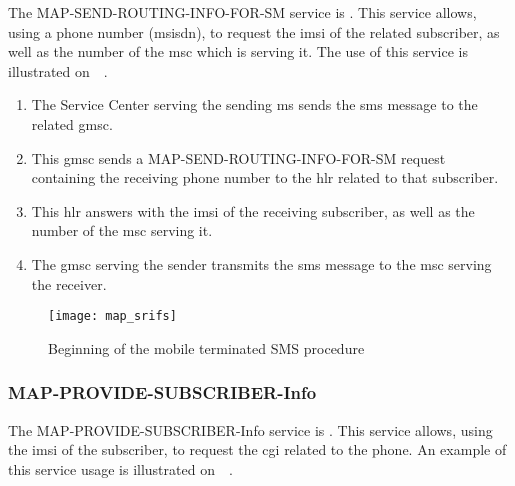         The MAP-SEND-ROUTING-INFO-FOR-SM service is . This service allows, using a phone number (\gls{msisdn}), to
    request the \gls{imsi} of the related subscriber, as well as the
    number of the \gls{msc} which is serving it. The use of this service
    is illustrated
    on~~\cite[p.~232]{3gpp_ts_2015-2}.
        
        \begin{enumerate}[topsep=-1em,parsep=0em,itemsep=0em]

          \item The Service Center serving the sending \gls{ms} sends
            the \gls{sms} message to the related \gls{gmsc}.         

          \item This \gls{gmsc} sends a MAP-SEND-ROUTING-INFO-FOR-SM
            request containing the receiving phone number to the
            \gls{hlr} related to that subscriber.

          \item This \gls{hlr} answers with the \gls{imsi} of the
            receiving subscriber, as well as the number of the \gls{msc}
            serving it.

          \item The \gls{gmsc} serving the sender transmits the
            \gls{sms} message to the \gls{msc} serving the receiver.
        
        \end{enumerate}
        
        \begin{figure}[h]
          \centering
          \texttt{[image: map\_srifs]}
          \caption{Beginning of the mobile terminated SMS
          procedure~\cite[p.~792]{3gpp_ts_2015-2}}
          \label{fig:map_srifs}
        \end{figure}

      \subsubsection{MAP-PROVIDE-SUBSCRIBER-Info}
      \label{sec:psi}
          
        The MAP-PROVIDE-SUBSCRIBER-Info service is . This service allows, using the
      \gls{imsi} of the subscriber, to request the \gls{cgi} related to
      the phone. An example of this service usage is illustrated
      on~~\cite[p.~181]{3gpp_ts_2015-2}.

